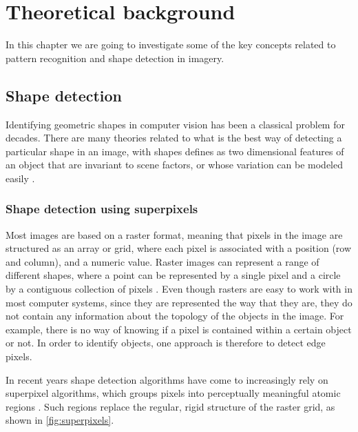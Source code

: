 \chapter{Theoretical background}
In this chapter we are going to investigate some of the key concepts related to pattern recognition and shape detection in imagery. 

\section{Shape detection}
Identifying geometric shapes in computer vision has been a classical problem for decades. There are many theories related to what is the best way of detecting a particular shape in an image, with shapes defines as two dimensional features of an object that are invariant to scene factors, or whose variation can be modeled easily \citep{Moon2002}.

\subsection{Shape detection using superpixels}
Most images are based on a raster format, meaning that pixels in the image are structured as an array or grid, where each pixel is associated with a position (row and column), and a numeric value. Raster images can represent a range of different shapes, where a point can be represented by a single pixel and a circle by a contiguous collection of pixels \citep{Worboys2003}. Even though rasters are easy to work with in most computer systems, since they are represented the way that they are, they do not contain any information about the topology of the objects in the image. For example, there is no way of knowing if a pixel is contained within a certain object or not. In order to identify objects, one approach is therefore to detect edge pixels.

In recent years shape detection algorithms have come to increasingly rely on superpixel algorithms, which groups pixels into perceptually meaningful atomic regions \citep{Achanta2012}. Such regions replace the regular, rigid structure of the raster grid, as shown in \autoref{fig:superpixels}.


